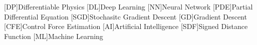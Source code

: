[DP]{Differentiable Physics}
[DL]{Deep Learning}
[NN]{Neural Network}
[PDE]{Partial Differential Equation}
[SGD]{Stochasitc Gradient Descent}
[GD]{Gradient Descent}
[CFE]{Control Force Estimation}
[AI]{Artificial Intelligence}
[SDF]{Signed Distance Function}
[ML]{Machine Learning}
